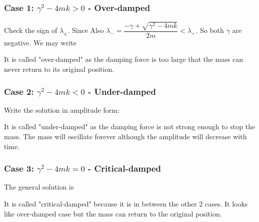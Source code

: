 \documentclass[class=article, crop=false, 12pt]{standalone}
\begin{document}
\subsubsection{Case 1: $\gamma^2-4mk>0$ - Over-damped}

Check the sign of $\lambda_\pm$. Since
Also $\lambda_- = \dfrac{-\gamma + \sqrt{\gamma^2-4mk}}{2m} <\lambda_+$. 
So both $\gamma$ are negative. We may write


It is called "over-damped" as the damping force is too large that 
the mass can never return to its original position.


\subsubsection{Case 2: $\gamma^2-4mk<0$ - Under-damped}

Write the solution in amplitude form:


It is called "under-damped" as the damping force is not strong enough to stop the mass.
The mass will oscillate forever although the amplitude will decrease with time.



\subsubsection{Case 3: $\gamma^2-4mk =0$ - Critical-damped}

The general solution is 


It is called "critical-damped" because it is in between the other 2 cases.
It looks like over-damped case but the mass can return to the original position.
\end{document}
